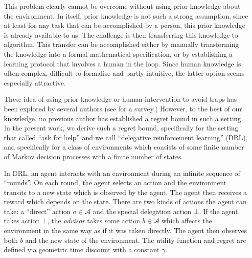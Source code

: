 \documentclass[anon,12pt]{colt2018} %
\newcommand{\A}{\mathcal{A}}
\begin{document}
This problem clearly cannot be overcome without using prior knowledge about the environment. In itself, prior knowledge is not such a strong assumption, since at least for any task that can be accomplished by a person, this prior knowledge is already available to us. The challenge is then transferring this knowledge to algorithm. This transfer can be accomplished either by manually transforming the knowledge into a formal mathematical specification, or by establishing a learning protocol that involves a human in the loop. Since human knowledge is often complex, difficult to formalise and partly intuitive, the latter option seems especially attractive.

These idea of using prior knowledge or human intervention to avoid traps has been explored by several authors (see \cite{Garcia2015} for a survey.) However, to the best of our knowledge, no previous author has established a regret bound in such a setting. In the present work, we derive such a regret bound, specifically for the setting that \cite{Clouse1997} called \enquote{ask for help} and we call \enquote{delegative reinforcement learning} (DRL), and specifically for a class of environments which consists of some finite number of Markov decision processes with a finite number of states.

In DRL, an agent interacts with an environment during an infinite sequence of \enquote{rounds}. On each round, the agent selects an action and the environment transits to a new state which is observed by the agent. The agent then receives a reward which depends on the state. There are two kinds of actions the agent can take: a \enquote{direct} action $a \in \A$ and the special delegation action $\bot$. If the agent takes action $\bot$, the \emph{advisor} takes some action $b \in \A$ which affects the environment in the same way as if it was taken directly. The agent then observes both $b$ and the new state of the environment. The utility function and regret are defined via geometric time discount with a constant $\gamma$.
\end{document}
